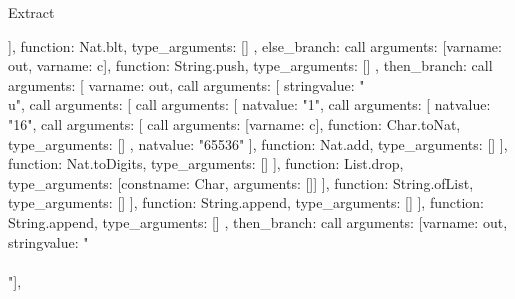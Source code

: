 \begin{lexlean}{Extract}
\begin{toolingmodule}
{{{{{{{{                    ],
                    function: Nat.blt,
                    type_arguments: []
                  },
                  else_branch: call{
                    arguments: [var{name: out}, var{name: c}],
                    function: String.push,
                    type_arguments: []
                  },
                  then_branch: call{
                    arguments: [
                      var{name: out},
                      call{
                        arguments: [
                          string{value: "\\u"},
                          call{
                            arguments: [
                              call{
                                arguments: [
                                  nat{value: "1"},
                                  call{
                                    arguments: [
                                      nat{value: "16"},
                                      call{
                                        arguments: [
                                          call{
                                            arguments: [var{name: c}],
                                            function: Char.toNat,
                                            type_arguments: []
                                          },
                                          nat{value: "65536"}
                                        ],
                                        function: Nat.add,
                                        type_arguments: []
                                      }
                                    ],
                                    function: Nat.toDigits,
                                    type_arguments: []
                                  }
                                ],
                                function: List.drop,
                                type_arguments: [const{name: Char, arguments: []}]
                              }
                            ],
                            function: String.ofList,
                            type_arguments: []
                          }
                        ],
                        function: String.append,
                        type_arguments: []
                      }
                    ],
                    function: String.append,
                    type_arguments: []
                  }
                },
                then_branch: call{
                  arguments: [var{name: out}, string{value: "\\\\"}],
}}}}}}}
\end{toolingmodule}
\end{lexlean}
